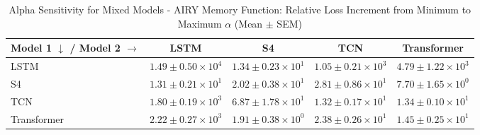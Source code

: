 
\begin{table}[h]
\centering
\caption{Alpha Sensitivity for Mixed Models - AIRY Memory Function: Relative Loss Increment from Minimum to Maximum $\alpha$ (Mean $\pm$ SEM)}
\label{tab:mixed_alpha_sensitivity_airy}
\begin{tabular}{lcccc}
\hline
Model 1 $\downarrow$ / Model 2 $\rightarrow$ & LSTM & S4 & TCN & Transformer \\
\hline
LSTM & $1.49 \pm 0.50 \times 10^{4}$ & $1.34 \pm 0.23 \times 10^{1}$ & $1.05 \pm 0.21 \times 10^{3}$ & $4.79 \pm 1.22 \times 10^{3}$ \\
S4 & $1.31 \pm 0.21 \times 10^{1}$ & $2.02 \pm 0.38 \times 10^{1}$ & $2.81 \pm 0.86 \times 10^{1}$ & $7.70 \pm 1.65 \times 10^{0}$ \\
TCN & $1.80 \pm 0.19 \times 10^{3}$ & $6.87 \pm 1.78 \times 10^{1}$ & $1.32 \pm 0.17 \times 10^{1}$ & $1.34 \pm 0.10 \times 10^{1}$ \\
Transformer & $2.22 \pm 0.27 \times 10^{3}$ & $1.91 \pm 0.38 \times 10^{0}$ & $2.38 \pm 0.26 \times 10^{1}$ & $1.45 \pm 0.25 \times 10^{1}$ \\
\hline
\end{tabular}
\end{table}
